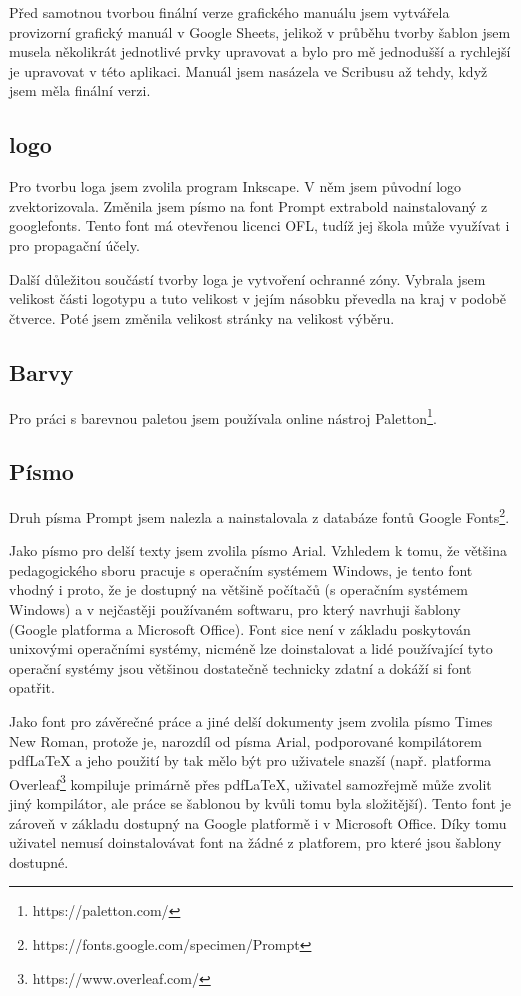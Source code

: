 \documentclass[11pt,a4paper,twoside,openright]{report}
\begin{document}
Před samotnou tvorbou finální verze grafického manuálu jsem vytvářela provizorní grafický manuál v Google Sheets, jelikož v průběhu tvorby šablon jsem musela několikrát jednotlivé prvky upravovat a bylo pro mě jednodušší a rychlejší je upravovat v této aplikaci. Manuál jsem nasázela ve Scribusu až tehdy, když jsem měla finální verzi.

\subsection{logo}
Pro tvorbu loga jsem zvolila program Inkscape. V něm jsem původní logo zvektorizovala. Změnila jsem písmo na font Prompt extrabold nainstalovaný z googlefonts. Tento font má otevřenou licenci OFL, tudíž jej škola může využívat i pro propagační účely.

Další důležitou součástí tvorby loga je vytvoření ochranné zóny. Vybrala jsem velikost části logotypu a tuto velikost v jejím násobku převedla na kraj v podobě čtverce. Poté jsem změnila velikost stránky na velikost výběru.

\subsection{Barvy}
Pro práci s barevnou paletou jsem používala online nástroj Paletton\footnote{https://paletton.com/}.

\subsection{Písmo}
Druh písma Prompt jsem nalezla a nainstalovala z databáze fontů Google Fonts\footnote{https://fonts.google.com/specimen/Prompt}.

Jako písmo pro delší texty jsem zvolila písmo Arial. Vzhledem k tomu, že většina pedagogického sboru pracuje s operačním systémem Windows, je tento font vhodný i proto, že je dostupný na většině počítačů (s operačním systémem Windows) a v nejčastěji používaném softwaru, pro který navrhuji šablony (Google platforma a Microsoft Office). Font sice není v základu poskytován unixovými operačními systémy, nicméně lze doinstalovat a lidé používající tyto operační systémy jsou většinou dostatečně technicky zdatní a dokáží si font opatřit.

Jako font pro závěrečné práce a jiné delší dokumenty jsem zvolila písmo Times New Roman, protože je, narozdíl od písma Arial, podporované kompilátorem pdfLaTeX a jeho použití by tak mělo být pro uživatele snazší (např. platforma Overleaf\footnote{https://www.overleaf.com/} kompiluje primárně přes pdfLaTeX, uživatel samozřejmě může zvolit jiný kompilátor, ale práce se šablonou by kvůli tomu byla složitější). Tento font je zároveň v základu dostupný na Google platformě i v Microsoft Office. Díky tomu uživatel nemusí doinstalovávat font na žádné z platforem, pro které jsou šablony dostupné.
\end{document}

